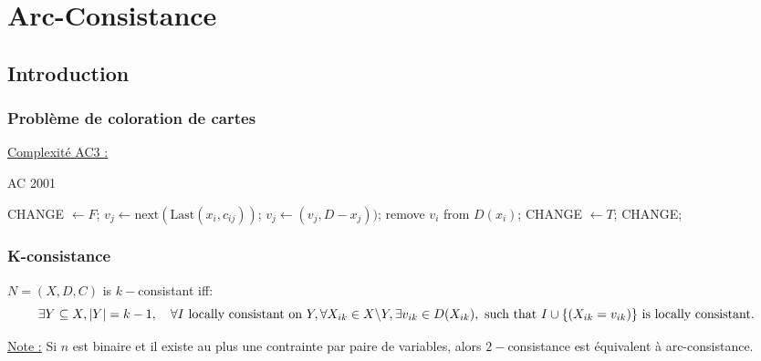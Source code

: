 \documentclass[a4paper,11pt]{thesis}
\begin{document}
\chapter{Arc-Consistance}

\section{Introduction}

\subsection{Problème de coloration de cartes}

\underline{Complexité AC3 :}


\begin{algorithm}[t]
    \caption{AC 2001}
    \label{algo_ac2001}
    \begin{algorithmic}[1]
            \State CHANGE $\gets F$;
                \State $v_j \gets \mbox{next}(\mbox{Last}(x_i, c_{ij}))$;
                    \State $v_j \gets (v_j, D-x_j))$;
                \EndWhile
                    \State remove $v_i$ from $D(x_i)$;
                    \State CHANGE $\gets T$;
                \EndIf
            \EndFor
            \State \Return CHANGE;
        \EndFunction
    \end{algorithmic}
\end{algorithm}

\subsection{K-consistance}

$N = (X, D, C)$ is $k-$consistant iff: \begin{displaymath}
\exists Y \subseteq X, | Y | = k -1, \quad \forall I \mbox{ locally consistant on } Y, \forall
X_{ik} \in X \backslash Y, \exists v_{ik} \in D(X_{ik}),\newline \mbox{ such that } I \cup \{(X_{ik} =
v_{ik})\} \mbox{ is locally consistant. }
\end{displaymath}


\underline{Note :} Si $n$ est binaire et il existe au plus une contrainte par paire de variables,
alors $2-$consistance est équivalent à arc-consistance.
\end{document}
